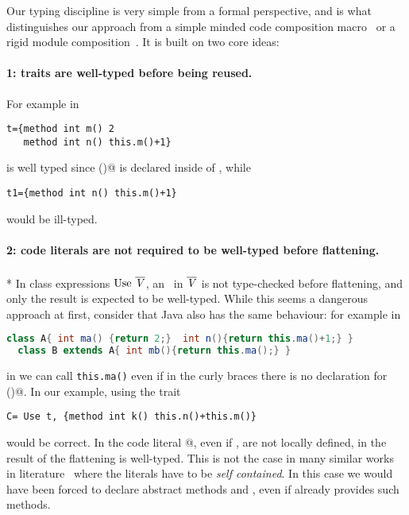 Our typing discipline is very simple from a formal perspective,  
and is what distinguishes our approach from a simple minded code composition macro~\cite{bawden1999quasiquotation}
or a rigid module composition~\cite{ancona2002calculus}. 
It is built on two core ideas:

\paragraph{1: traits are \textbf{well-typed} before being reused.}
 For example in

\saveSpace\begin{lstlisting}
t={method int m() 2 
   method int n() this.m()+1}
\end{lstlisting}\saveSpace

\noindent \Q@t@ is well typed since \Q@m()@ is declared inside of \Q@t@, while

\saveSpace\begin{lstlisting}
t1={method int n() this.m()+1} 
\end{lstlisting}\saveSpace
\noindent would be ill-typed.

\paragraph{2: code literals are \textbf{not required to be well-typed} before flattening.}${}_{}$\\*
In class expressions  $\use\ \overline\mV$,
an \mL\ in $\overline{\mathit{V}}$ is not type-checked before flattening, and only the result is expected to be well-typed.
While this seems a dangerous approach at first, consider that Java also has the same behaviour:
for example in
\saveSpace\begin{lstlisting}[language=Java]
  class A{ int ma() {return 2;}  int n(){return this.ma()+1;} }
  class B extends A{ int mb(){return this.ma();} }
\end{lstlisting}\saveSpace
\noindent in \Q@B@ we can call \lstinline{this.ma()} even if in the curly braces there is no declaration for \Q@ma()@.
In our example, using the trait \Q@t@

\saveSpace\begin{lstlisting}
C= Use t, {method int k() this.n()+this.m()}
\end{lstlisting}\saveSpace
\noindent would be correct. In the code literal
@, 
 even if \Q@n@, \Q@m@ are not locally defined, in 
\name the result of the flattening is well-typed.
This is not the case in many similar works in literature~\cite{deep,Bettini2015282,Bergel2007} where the
literals have to be \emph{self contained}. In this case we would have been forced to
declare abstract methods \Q@n@ and \Q@m@, even if \Q@t@ already 
provides such methods.


